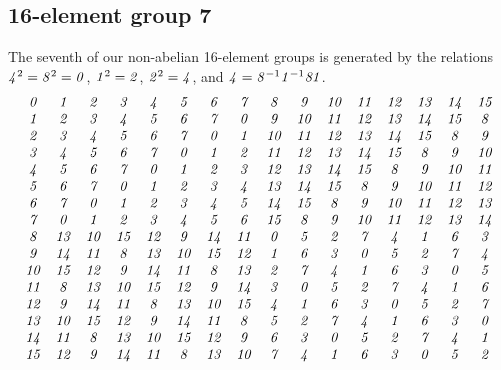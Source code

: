 \documentclass[12pt]{article}
\begin{document}
\subsection{16-element group 7}
The seventh of our non-abelian 16-element groups is generated by the
relations $\G4^2 = \G8^2 = \G0$, $\G1^2=\G2$, $\G2^2=\G4$, 
and $\G4=\G8^{-1}\G1^{-1}\G8\G1$.
\begin{displaymath}
\begin{array}{cccccccccccccccc}
\G0&  \G1&  \G2&  \G3&  \G4&  \G5&  \G6&  \G7&  \G8&  \G9& \G1\G0& \G1\G1& \G1\G2& \G1\G3& \G1\G4& \G1\G5 \\
\G1&  \G2&  \G3&  \G4&  \G5&  \G6&  \G7&  \G0&  \G9& \G1\G0& \G1\G1& \G1\G2& \G1\G3& \G1\G4& \G1\G5&  \G8 \\
\G2&  \G3&  \G4&  \G5&  \G6&  \G7&  \G0&  \G1& \G1\G0& \G1\G1& \G1\G2& \G1\G3& \G1\G4& \G1\G5&  \G8&  \G9 \\
\G3&  \G4&  \G5&  \G6&  \G7&  \G0&  \G1&  \G2& \G1\G1& \G1\G2& \G1\G3& \G1\G4& \G1\G5&  \G8&  \G9& \G1\G0 \\
\G4&  \G5&  \G6&  \G7&  \G0&  \G1&  \G2&  \G3& \G1\G2& \G1\G3& \G1\G4& \G1\G5&  \G8&  \G9& \G1\G0& \G1\G1 \\
\G5&  \G6&  \G7&  \G0&  \G1&  \G2&  \G3&  \G4& \G1\G3& \G1\G4& \G1\G5&  \G8&  \G9& \G1\G0& \G1\G1& \G1\G2 \\
\G6&  \G7&  \G0&  \G1&  \G2&  \G3&  \G4&  \G5& \G1\G4& \G1\G5&  \G8&  \G9& \G1\G0& \G1\G1& \G1\G2& \G1\G3 \\
\G7&  \G0&  \G1&  \G2&  \G3&  \G4&  \G5&  \G6& \G1\G5&  \G8&  \G9& \G1\G0& \G1\G1& \G1\G2& \G1\G3& \G1\G4 \\
\G8& \G1\G3& \G1\G0& \G1\G5& \G1\G2&  \G9& \G1\G4& \G1\G1&  \G0&  \G5&  \G2&  \G7&  \G4&  \G1&  \G6&  \G3 \\
\G9& \G1\G4& \G1\G1&  \G8& \G1\G3& \G1\G0& \G1\G5& \G1\G2&  \G1&  \G6&  \G3&  \G0&  \G5&  \G2&  \G7&  \G4 \\
\G1\G0& \G1\G5& \G1\G2&  \G9& \G1\G4& \G1\G1&  \G8& \G1\G3&  \G2&  \G7&  \G4&  \G1&  \G6&  \G3&  \G0&  \G5 \\
\G1\G1&  \G8& \G1\G3& \G1\G0& \G1\G5& \G1\G2&  \G9& \G1\G4&  \G3&  \G0&  \G5&  \G2&  \G7&  \G4&  \G1&  \G6 \\
\G1\G2&  \G9& \G1\G4& \G1\G1&  \G8& \G1\G3& \G1\G0& \G1\G5&  \G4&  \G1&  \G6&  \G3&  \G0&  \G5&  \G2&  \G7 \\
\G1\G3& \G1\G0& \G1\G5& \G1\G2&  \G9& \G1\G4& \G1\G1&  \G8&  \G5&  \G2&  \G7&  \G4&  \G1&  \G6&  \G3&  \G0 \\
\G1\G4& \G1\G1&  \G8& \G1\G3& \G1\G0& \G1\G5& \G1\G2&  \G9&  \G6&  \G3&  \G0&  \G5&  \G2&  \G7&  \G4&  \G1 \\
\G1\G5& \G1\G2&  \G9& \G1\G4& \G1\G1&  \G8& \G1\G3& \G1\G0&  \G7&  \G4&  \G1&  \G6&  \G3&  \G0&  \G5&  \G2
\end{array}
\end{displaymath}
\end{document}
